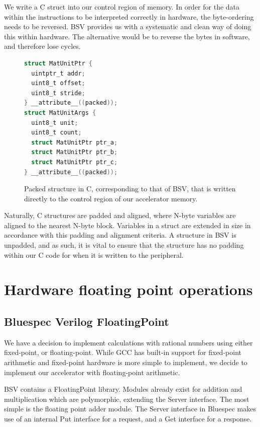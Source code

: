 \documentclass[a4paper,8pt]{report}
\begin{document}
We write a C struct into our control region of memory. In order for the data
within the instructions to be interpreted correctly in hardware, the
byte-ordering needs to be reversed. BSV provides us with a systematic and clean
way of doing this within hardware. The alternative would be to reverse the bytes
in software, and therefore lose cycles. \\

\begin{figure}[h]
  \centering 
  \scriptsize
\begin{lstlisting}[language=C,style=customc,xleftmargin=.3\textwidth]
struct MatUnitPtr {
  uintptr_t addr;
  uint8_t offset;
  uint8_t stride;
} __attribute__((packed));
struct MatUnitArgs {
  uint8_t unit;
  uint8_t count;
  struct MatUnitPtr ptr_a;
  struct MatUnitPtr ptr_b;
  struct MatUnitPtr ptr_c;
} __attribute__((packed));
\end{lstlisting}
  \normalsize
  \caption{Packed structure in C, corresponding to that of BSV, that is written directly to the
    control region of our accelerator memory. }
\end{figure}


Naturally, C structures are padded and aligned, where N-byte variables are
aligned to the nearest N-byte block. Variables in a struct are extended in size
in accordance with this padding and alignment criteria. A structure in BSV is
unpadded, and as such, it is vital to ensure that the structure has no padding
within our C code for when it is written to the peripheral.

\section{Hardware floating point operations}
\subsection{Bluespec Verilog FloatingPoint}
We have a decision to implement calculations with rational numbers using either
fixed-point, or floating-point. While GCC has built-in support for fixed-point
arithmetic and fixed-point hardware is more simple to implement, we decide to
implement our accelerator with floating-point arithmetic.

BSV contains a FloatingPoint library. Modules already exist for addition and
multiplication which are polymorphic, extending the Server interface. The most
simple is the floating point adder module. The Server interface in Bluespec
makes use of an internal Put interface for a request, and a Get interface for a
response.
\end{document}
